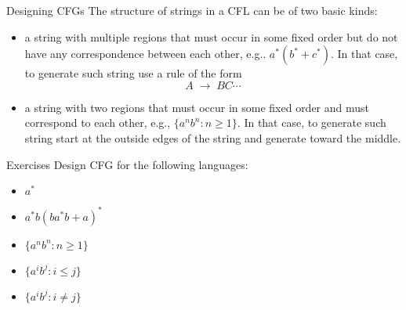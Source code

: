 \documentclass{prosper}%
\newcommand{\ra}{\mbox{$\;\rightarrow\;$}}
\begin{document}
\begin{slide}{Designing CFGs}
The structure of strings in a CFL can be of two basic kinds:
\begin{itemize}
\item  a string with multiple regions that must occur in some fixed order but do not have any correspondence between each other, e.g.. $a^*(b^*+c^*)$. In that case, to generate such  string use a rule of the form
\[
A \ra BC \cdots
\]
\item a string with two regions that must occur in some fixed order and must correspond to each other, e.g., $\{a^nb^n: n\geq 1\}$. In that case,  to generate such string start at the outside edges of the string and generate toward the middle.
\end{itemize}
\end{slide}


\begin{slide}{Exercises}
Design CFG for the following languages:
\begin{itemize}
\item $a^*$
\item $a^*b(ba^*b+a)^*$
\item $\{a^nb^n: n\geq 1\}$
\item $\{a^ib^j: i\leq j\}$
\item $\{a^ib^j: i\neq j\}$
\end{itemize}
\end{slide}
\end{document}
